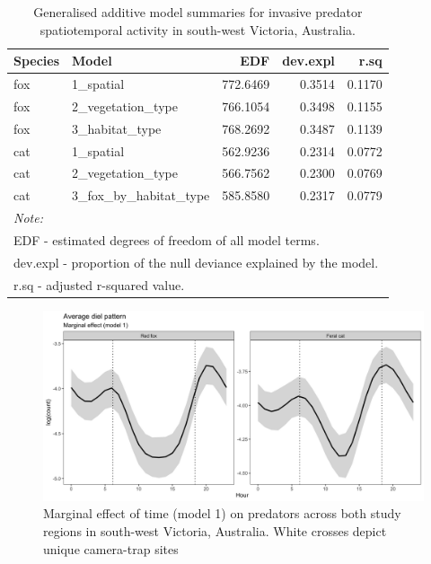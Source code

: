 \documentclass[]{elsarticle} %
\begin{document}
\begin{longtable}[t]{llrrr}
\caption{\label{tab:diel-tab-fits}Generalised additive model summaries for invasive predator spatiotemporal activity in south-west Victoria, Australia.}\\
\toprule
Species & Model & EDF & dev.expl & r.sq\\
\midrule
fox & 1\_spatial & 772.6469 & 0.3514 & 0.1170\\
fox & 2\_vegetation\_type & 766.1054 & 0.3498 & 0.1155\\
fox & 3\_habitat\_type & 768.2692 & 0.3487 & 0.1139\\
cat & 1\_spatial & 562.9236 & 0.2314 & 0.0772\\
cat & 2\_vegetation\_type & 566.7562 & 0.2300 & 0.0769\\
\addlinespace
cat & 3\_fox\_by\_habitat\_type & 585.8580 & 0.2317 & 0.0779\\
\bottomrule
\multicolumn{5}{l}{\rule{0pt}{1em}\textit{Note: }}\\
\multicolumn{5}{l}{\rule{0pt}{1em}EDF - estimated degrees of freedom of all model terms.}\\
\multicolumn{5}{l}{\rule{0pt}{1em}dev.expl - proportion of the null deviance explained by the model. }\\
\multicolumn{5}{l}{\rule{0pt}{1em}r.sq -  adjusted r-squared value.}\\
\end{longtable}
\endgroup{}

\newpage

\begin{figure}

{\centering \includegraphics[width=1\linewidth]{../figs/avg_diel_predator} 

}

\caption{Marginal effect of time (model 1) on predators across both study regions in south-west Victoria, Australia. White crosses depict unique camera-trap sites}\label{fig:diel-space-time-marginal}
\end{figure}
\end{document}
